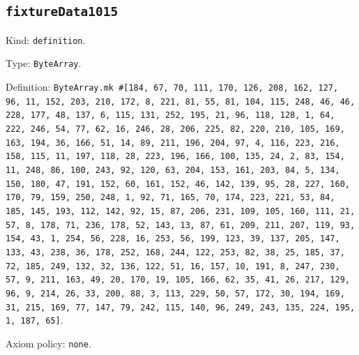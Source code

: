 \documentclass[11pt]{article}
\begin{document}
\subsection*{\texttt{fixtureData1015}}
\noindent Kind: \texttt{definition}.\par
\noindent Type: \texttt{ByteArray}.\par
\noindent Definition: \texttt{ByteArray.mk \#[184, 67, 70, 111, 170, 126, 208, 162, 127, 96, 11, 152, 203, 210, 172, 8, 221, 81, 55, 81, 104, 115, 248, 46, 46, 228, 177, 48, 137, 6, 115, 131, 252, 195, 21, 96, 118, 128, 1, 64, 222, 246, 54, 77, 62, 16, 246, 28, 206, 225, 82, 220, 210, 105, 169, 163, 194, 36, 166, 51, 14, 89, 211, 196, 204, 97, 4, 116, 223, 216, 158, 115, 11, 197, 118, 28, 223, 196, 166, 100, 135, 24, 2, 83, 154, 11, 248, 86, 100, 243, 92, 120, 63, 204, 153, 161, 203, 84, 5, 134, 150, 180, 47, 191, 152, 60, 161, 152, 46, 142, 139, 95, 28, 227, 160, 170, 79, 159, 250, 248, 1, 92, 71, 165, 70, 174, 223, 221, 53, 84, 185, 145, 193, 112, 142, 92, 15, 87, 206, 231, 109, 105, 160, 111, 21, 57, 8, 178, 71, 236, 178, 52, 143, 13, 87, 61, 209, 211, 207, 119, 93, 154, 43, 1, 254, 56, 228, 16, 253, 56, 199, 123, 39, 137, 205, 147, 133, 43, 238, 36, 178, 252, 168, 244, 122, 253, 82, 38, 25, 185, 37, 72, 185, 249, 132, 32, 136, 122, 51, 16, 157, 10, 191, 8, 247, 230, 57, 9, 211, 163, 49, 20, 170, 19, 105, 166, 62, 35, 41, 26, 217, 129, 96, 9, 214, 26, 33, 200, 88, 3, 113, 229, 50, 57, 172, 30, 194, 169, 31, 215, 169, 77, 147, 79, 242, 115, 140, 96, 249, 243, 135, 224, 195, 1, 187, 65]}.\par
\noindent Axiom policy: \texttt{none}.\par
\end{document}
